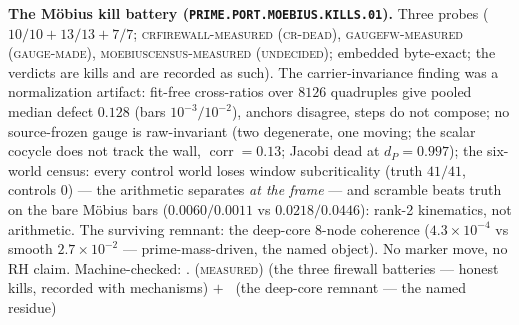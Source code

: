 \par\smallskip\noindent\textbf{The M\"obius kill battery
(\texttt{PRIME.PORT.MOEBIUS.\allowbreak KILLS.01}).}
Three probes ($10/10 + 13/13 + 7/7$;
\textsc{crfirewall-measured (cr-dead)},
\textsc{gaugefw-measured (gauge-made)},
\textsc{moebiuscensus-measured (undecided)}; embedded
byte-exact; the verdicts are kills and are recorded as such).
The carrier-invariance finding was a normalization artifact:
fit-free cross-ratios over $8126$ quadruples give pooled median
defect $0.128$ (bars $10^{-3}/10^{-2}$), anchors disagree,
steps do not compose; no source-frozen gauge is raw-invariant
(two degenerate, one moving; the scalar cocycle does not track
the wall, $\operatorname{corr} = 0.13$; Jacobi dead at $d_P =
0.997$); the six-world census: every control world loses window
subcriticality (truth $41/41$, controls $0$) --- the arithmetic
separates \emph{at the frame} --- and scramble beats truth on
the bare M\"obius bars ($0.0060/0.0011$ vs $0.0218/0.0446$):
rank-2 kinematics, not arithmetic.  The surviving remnant: the
deep-core $8$-node coherence ($4.3\times10^{-4}$ vs smooth
$2.7\times10^{-2}$ --- prime-mass-driven, the named object).
No marker move, no RH claim.
Machine-checked: .
(\textsc{measured}) (the three firewall batteries --- honest
kills, recorded with mechanisms) $+$ \mO\ (the deep-core
remnant --- the named residue)
\par\smallskip


